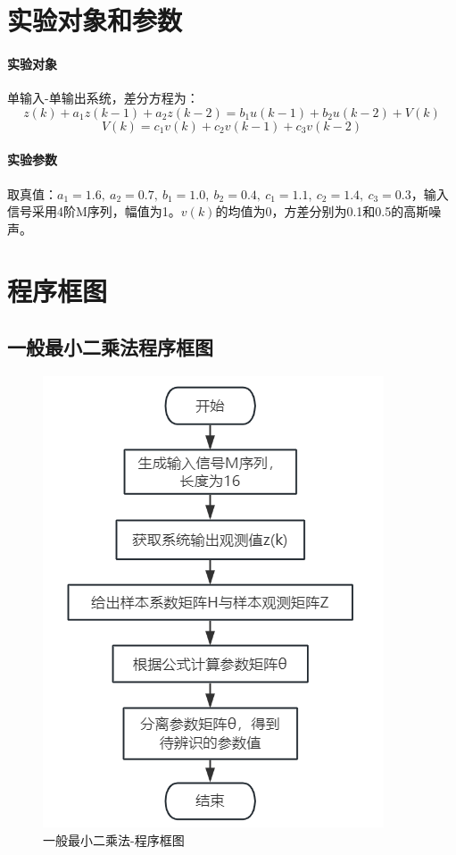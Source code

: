 \documentclass[UTF8]{article}
\begin{document}
%
\section{实验对象和参数}
\paragraph{实验对象}
单输入-单输出系统，差分方程为：
\begin{equation*}
    z(k) + a_1z(k-1) + a_2z(k-2) = b_1u(k-1) + b_2u(k-2) + V(k)
\end{equation*}
\begin{equation*}
    V(k) = c_1v(k) + c_2v(k-1) + c_3v(k-2)
\end{equation*}

\paragraph{实验参数}
取真值：$a_1 = 1.6,\ a_2 = 0.7,\ b_1 = 1.0,\ b_2 = 0.4,\ c_1 = 1.1,\ c_2 = 1.4,\ c_3 = 0.3$，输入信号采用4阶M序列，幅值为1。$v(k)$的均值为0，方差分别为0.1和0.5的高斯噪声。

%
\section{程序框图}
\subsection{一般最小二乘法程序框图}
\begin{figure}[H]
    \centering %
    \includegraphics[width=.6\textwidth]{figure/一般最小二乘-流程图.png} 
    \caption{一般最小二乘法-程序框图} %
\end{figure}
\end{document}
